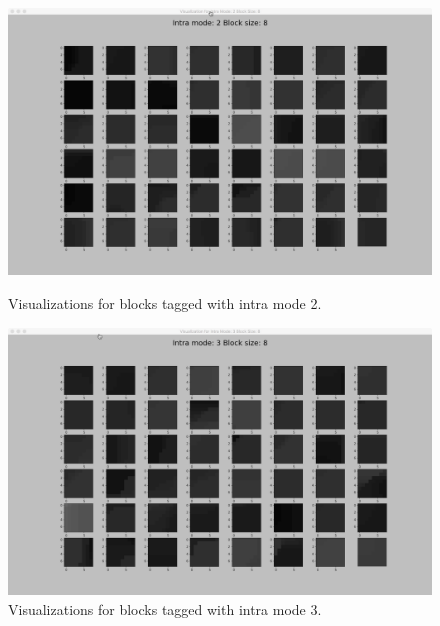 \begin{figure}[H]
        \vspace*{1cm} %
    
        \begin{minipage}{0.49\textwidth}
            \includegraphics[width=\linewidth]{Figures/visu-size8x8/8-2.jpeg}
            \caption[Visualizations for blocks tagged with intra mode 2]{Visualizations for blocks tagged with intra mode 2.}
            \label{fig:size8_mode2}
        \end{minipage}
        \hspace{\fill} %
        \begin{minipage}{0.49\textwidth}
            \includegraphics[width=\linewidth]{Figures/visu-size8x8/8-3}
            \caption[Visualizations for blocks tagged with intra mode 3]{Visualizations for blocks tagged with intra mode 3.}
            \label{fig:size8_mode3}
        \end{minipage}
    \end{figure}
    
